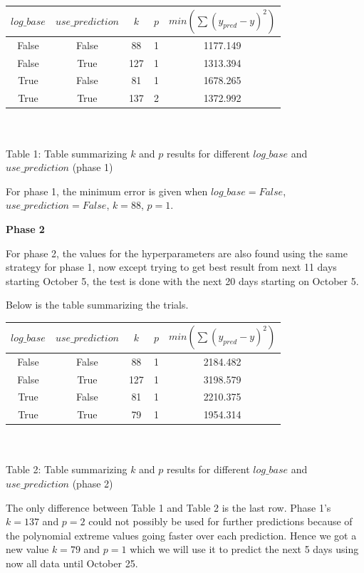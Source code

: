 \begin{center}
    \begin{tabular}{|c | c | c | c | c |} 
    \hline
    $log\_base$ & $use\_prediction$ & $k$ & $p$ & $min(\sum (y_{pred} - y)^2)$  \\ [0.5ex]
    \hline\hline
    False & False & 88  & 1 & 1177.149 \\
    \hline
    False & True  & 127 & 1 & 1313.394 \\
    \hline
    True  & False & 81  & 1 & 1678.265 \\
    \hline
    True  & True  & 137 & 2 & 1372.992 \\
    \hline
   \end{tabular}\\~\\
   Table 1: Table summarizing $k$ and $p$ results for different $log\_base$ and $use\_prediction$ (phase 1)
\end{center}

For phase 1, the minimum error is given when $log\_base = False$, $use\_prediction = False$, $k = 88$, $p = 1$.

\textbf{Phase 2}

For phase 2, the values for the hyperparameters are also found using the same strategy for phase 1, now except trying to get best result from next 11 days starting October 5, the test is done with the next 20 days starting on October 5.

Below is the table summarizing the trials.

\begin{center}
    \begin{tabular}{|c | c | c | c | c |} 
    \hline
    $log\_base$ & $use\_prediction$ & $k$ & $p$ & $min(\sum (y_{pred} - y)^2)$  \\ [0.5ex]
    \hline\hline
    False & False & 88  & 1 & 2184.482 \\
    \hline
    False & True  & 127 & 1 & 3198.579 \\
    \hline
    True  & False & 81  & 1 & 2210.375 \\
    \hline
    True  & True  & 79  & 1 & 1954.314 \\
    \hline
   \end{tabular}\\~\\
   Table 2: Table summarizing $k$ and $p$ results for different $log\_base$ and $use\_prediction$ (phase 2)
\end{center}

The only difference between Table 1 and Table 2 is the last row. Phase 1's $k = 137$ and $p = 2$ could not possibly be used for further predictions because of the polynomial extreme values going faster over each prediction. Hence we got a new value $k = 79$ and $p = 1$ which we will use it to predict the next 5 days using now all data until October 25.

